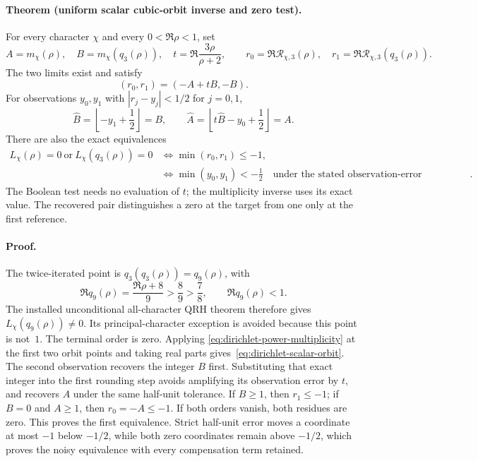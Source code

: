 \paragraph{Theorem (uniform scalar cubic-orbit inverse and zero test).}
For every character \(\chi\) and every \(0<\Re\rho<1\), set
\[
 A=m_\chi(\rho),\quad B=m_\chi(q_3(\rho)),\quad
 t=\Re\frac{3\rho}{\rho+2},\qquad
 r_0=\Re\mathcal R_{\chi,3}(\rho),\quad
 r_1=\Re\mathcal R_{\chi,3}(q_3(\rho)).
\]
The two limits exist and satisfy
\begin{equation}
 (r_0,r_1)=(-A+tB,-B).
 \label{eq:dirichlet-scalar-orbit}
\end{equation}
For observations \(y_0,y_1\) with \(|r_j-y_j|<1/2\) for \(j=0,1\),
\[
 \widehat B=\left\lfloor-y_1+\frac12\right\rfloor=B,
 \qquad
 \widehat A=\left\lfloor t\widehat B-y_0+\frac12\right\rfloor=A.
\]
There are also the exact equivalences
\begin{align*}
 L_\chi(\rho)=0\ \text{or}\ L_\chi(q_3(\rho))=0
 &\iff \min(r_0,r_1)\le-1,\\
 &\iff \min(y_0,y_1)<-\frac12
       \quad\text{under the stated observation-error hypotheses}.
\end{align*}
The Boolean test needs no evaluation of \(t\); the multiplicity inverse
uses its exact value. The recovered pair distinguishes a zero at the target
from one only at the first reference.

\paragraph{Proof.}
The twice-iterated point is \(q_3(q_3(\rho))=q_9(\rho)\), with
\[
 \Re q_9(\rho)=\frac{\Re\rho+8}{9}>\frac89>\frac78,
 \qquad \Re q_9(\rho)<1.
\]
The installed unconditional all-character QRH theorem therefore gives
\(L_\chi(q_9(\rho))\ne0\). Its principal-character exception is avoided
because this point is not~\(1\). The terminal order is zero. Applying
\eqref{eq:dirichlet-power-multiplicity} at the first two orbit points and
taking real parts gives~\eqref{eq:dirichlet-scalar-orbit}.
The second observation recovers the integer \(B\) first. Substituting that
exact integer into the first rounding step avoids amplifying its observation
error by \(t\), and recovers \(A\) under the same half-unit tolerance.
If \(B\ge1\), then \(r_1\le-1\); if \(B=0\) and \(A\ge1\), then
\(r_0=-A\le-1\). If both orders vanish, both residues are zero. This proves
the first equivalence. Strict half-unit error moves a coordinate at most
\(-1\) below \(-1/2\), while both zero coordinates remain above \(-1/2\),
which proves the noisy equivalence with every compensation term retained.

